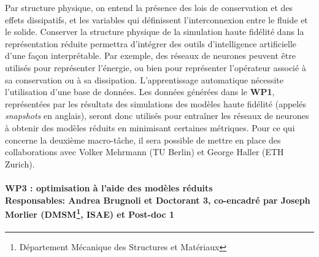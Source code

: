 \documentclass[12pt, french]{article}
\begin{document}
	 Par structure physique, on entend la présence des lois de conservation et des effets dissipatifs, et les variables qui définissent l'interconnexion entre le fluide et le solide. Conserver la structure physique de la simulation haute fidélité dans la représentation réduite permettra d'intégrer des outils d'intelligence artificielle d'une façon interprétable.  Par exemple, des réseaux de neurones peuvent être utilisés pour représenter l'énergie, ou bien pour représenter l'opérateur associé à sa conservation ou à sa dissipation. L'apprentissage automatique nécessite l'utilisation d'une base de données. Les données générées dans le \textbf{WP1}, représentées par les résultats des simulations des modèles haute fidélité (appelés \textit{snapshots} en anglais), seront donc utilisés pour entraîner les réseaux de neurones à obtenir des modèles réduits en minimisant certaines métriques. 
	Pour ce qui concerne la deuxième macro-tâche, il sera possible de mettre en place des collaborations avec Volker Mehrmann (TU Berlin) et George Haller (ETH Zurich).
	
	
	\paragraph[\large WP3 : optimisation à l'aide des modèles réduits\\
	Responsables: Andrea Brugnoli et Doctorant 3, co-encadré par Joseph Morlier (DMSM, ISAE) et Post-doc 1\\]{\large WP3 : optimisation à l'aide des modèles réduits\\
		Responsables: Andrea Brugnoli et Doctorant 3, co-encadré par Joseph Morlier (DMSM\footnote{Département Mécanique des Structures et Matériaux}, ISAE) et Post-doc 1\\}
\end{document}
